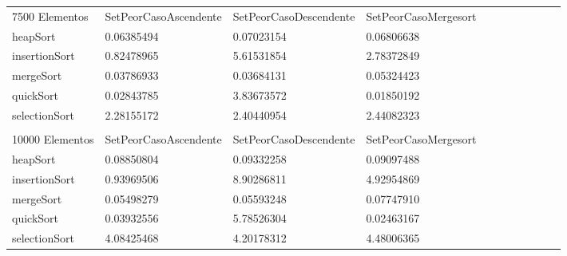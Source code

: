 \documentclass[article,a4paper]{article}
\begin{document}
\begin{table}[h]
\begin{adjustbox}{width=\textwidth,totalheight=\textheight,keepaspectratio}
\begin{tabular}{lllllllllll}
7500 Elementos  & SetPeorCasoAscendente & SetPeorCasoDescendente & SetPeorCasoMergesort \\
heapSort        & 0.06385494            & 0.07023154             & 0.06806638           \\
insertionSort   & 0.82478965            & 5.61531854             & 2.78372849           \\
mergeSort       & 0.03786933            & 0.03684131             & 0.05324423           \\
quickSort       & 0.02843785            & 3.83673572             & 0.01850192           \\
selectionSort   & 2.28155172            & 2.40440954             & 2.44082323           \\
                &                       &                        &                      \\
10000 Elementos & SetPeorCasoAscendente & SetPeorCasoDescendente & SetPeorCasoMergesort \\
heapSort        & 0.08850804            & 0.09332258             & 0.09097488           \\
insertionSort   & 0.93969506            & 8.90286811             & 4.92954869           \\
mergeSort       & 0.05498279            & 0.05593248             & 0.07747910           \\
quickSort       & 0.03932556            & 5.78526304             & 0.02463167           \\
selectionSort   & 4.08425468            & 4.20178312             & 4.48006365           
\end{tabular}
\end{adjustbox}
\end{table}
\end{document}
